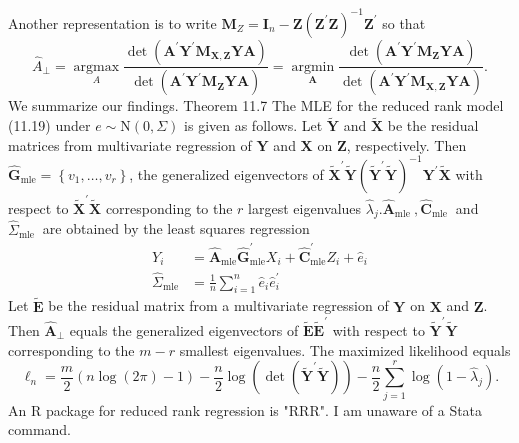 \documentclass[10pt]{article}
\begin{document}
Another representation is to write $\boldsymbol{M}_{Z}=\boldsymbol{I}_{n}-\boldsymbol{Z}\left(\boldsymbol{Z}^{\prime} \boldsymbol{Z}\right)^{-1} \boldsymbol{Z}^{\prime}$ so that
$$
\widehat{A}_{\perp}=\underset{A}{\operatorname{argmax}} \frac{\operatorname{det}\left(\boldsymbol{A}^{\prime} \boldsymbol{Y}^{\prime} \boldsymbol{M}_{\boldsymbol{X}, \boldsymbol{Z}} \boldsymbol{Y} \boldsymbol{A}\right)}{\operatorname{det}\left(\boldsymbol{A}^{\prime} \boldsymbol{Y}^{\prime} \boldsymbol{M}_{\boldsymbol{Z}} \boldsymbol{Y} \boldsymbol{A}\right)}=\underset{\boldsymbol{A}}{\operatorname{argmin}} \frac{\operatorname{det}\left(\boldsymbol{A}^{\prime} \boldsymbol{Y}^{\prime} \boldsymbol{M}_{\boldsymbol{Z}} \boldsymbol{Y} \boldsymbol{A}\right)}{\operatorname{det}\left(\boldsymbol{A}^{\prime} \boldsymbol{Y}^{\prime} \boldsymbol{M}_{\boldsymbol{X}, \boldsymbol{Z}} \boldsymbol{Y} \boldsymbol{A}\right)} .
$$
We summarize our findings. Theorem 11.7 The MLE for the reduced rank model (11.19) under $e \sim \mathrm{N}(0, \Sigma)$ is given as follows. Let $\tilde{\boldsymbol{Y}}$ and $\widetilde{\boldsymbol{X}}$ be the residual matrices from multivariate regression of $\boldsymbol{Y}$ and $\boldsymbol{X}$ on $\boldsymbol{Z}$, respectively. Then $\widehat{\boldsymbol{G}}_{\mathrm{mle}}=\left\{v_{1}, \ldots, v_{r}\right\}$, the generalized eigenvectors of $\widetilde{\boldsymbol{X}}^{\prime} \tilde{\boldsymbol{Y}}\left(\widetilde{\boldsymbol{Y}}^{\prime} \tilde{\boldsymbol{Y}}\right)^{-1} \boldsymbol{Y}^{\prime} \widetilde{\boldsymbol{X}}$ with respect to $\widetilde{\boldsymbol{X}}^{\prime} \widetilde{\boldsymbol{X}}$ corresponding to the $r$ largest eigenvalues $\widehat{\lambda}_{j} . \widehat{\boldsymbol{A}}_{\text {mle }}, \widehat{\boldsymbol{C}}_{\text {mle }}$ and $\widehat{\Sigma}_{\text {mle }}$ are obtained by the least squares regression
$$
\begin{aligned}
Y_{i} &=\widehat{\boldsymbol{A}}_{\mathrm{mle}} \widehat{\boldsymbol{G}}_{\mathrm{mle}}^{\prime} X_{i}+\widehat{\boldsymbol{C}}_{\mathrm{mle}}^{\prime} Z_{i}+\widehat{e}_{i} \\
\widehat{\Sigma}_{\mathrm{mle}} &=\frac{1}{n} \sum_{i=1}^{n} \widehat{e}_{i} \widehat{e}_{i}^{\prime}
\end{aligned}
$$
Let $\widetilde{\boldsymbol{E}}$ be the residual matrix from a multivariate regression of $\boldsymbol{Y}$ on $\boldsymbol{X}$ and $\boldsymbol{Z}$. Then $\widehat{\boldsymbol{A}}_{\perp}$ equals the generalized eigenvectors of $\widetilde{\boldsymbol{E}} \widetilde{\boldsymbol{E}}^{\prime}$ with respect to $\widetilde{\boldsymbol{Y}}^{\prime} \widetilde{\boldsymbol{Y}}$ corresponding to the $m-r$ smallest eigenvalues. The maximized likelihood equals
$$
\ell_{n}=\frac{m}{2}(n \log (2 \pi)-1)-\frac{n}{2} \log \left(\operatorname{det}\left(\widetilde{\boldsymbol{Y}}^{\prime} \tilde{\boldsymbol{Y}}\right)\right)-\frac{n}{2} \sum_{j=1}^{r} \log \left(1-\widehat{\lambda}_{j}\right) .
$$
An R package for reduced rank regression is "RRR". I am unaware of a Stata command.
\end{document}
